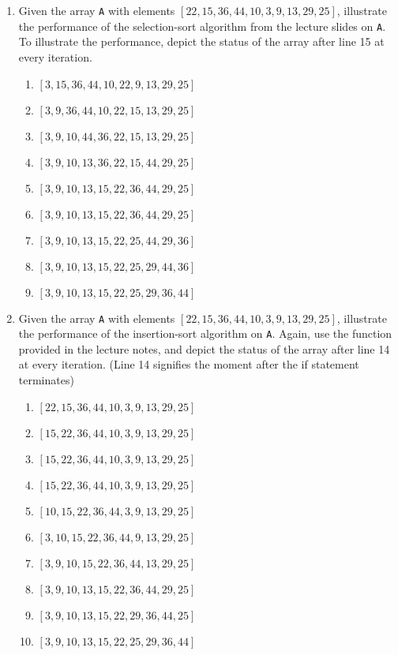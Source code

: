\documentclass[11pt]{article}
\begin{document}
\begin{enumerate}[leftmargin=*]
    \item Given the array \verb|A| with elements $[22, 15, 36, 44, 10, 3, 9, 13, 29, 25]$, illustrate the performance of the selection-sort algorithm from the lecture slides on \verb|A|. To illustrate the performance, depict the status of the array after line 15 at every iteration.
    \begin{enumerate}[label=(i:{\arabic*}),start=0]
            \item $[3, 15, 36, 44, 10, 22, 9, 13, 29, 25]$
            \item $[3, 9, 36, 44, 10, 22, 15, 13, 29, 25]$
            \item $[3, 9, 10, 44, 36, 22, 15, 13, 29, 25]$
            \item $[3, 9, 10, 13, 36, 22, 15, 44, 29, 25]$
            \item $[3, 9, 10, 13, 15, 22, 36, 44, 29, 25]$
            \item $[3, 9, 10, 13, 15, 22, 36, 44, 29, 25]$
            \item $[3, 9, 10, 13, 15, 22, 25, 44, 29, 36]$
            \item $[3, 9, 10, 13, 15, 22, 25, 29, 44, 36]$
            \item $[3, 9, 10, 13, 15, 22, 25, 29, 36, 44]$
    \end{enumerate}
    \item Given the array \verb|A| with elements $[22, 15, 36, 44, 10, 3, 9, 13, 29, 25]$, illustrate the performance of the insertion-sort algorithm on \verb|A|. Again, use the function provided in the lecture notes, and depict the status of the array after line 14 at every iteration. (Line 14 signifies the moment after the if statement terminates)
    \begin{enumerate}[label=(i:{\arabic*}), start=0]
            \item $[22, 15, 36, 44, 10, 3, 9, 13, 29, 25]$
            \item $[15, 22, 36, 44, 10, 3, 9, 13, 29, 25]$
            \item $[15, 22, 36, 44, 10, 3, 9, 13, 29, 25]$
            \item $[15, 22, 36, 44, 10, 3, 9, 13, 29, 25]$
            \item $[10, 15, 22, 36, 44, 3, 9, 13, 29, 25]$
            \item $[3, 10, 15, 22, 36, 44, 9, 13, 29, 25]$
            \item $[3, 9, 10, 15, 22, 36, 44, 13, 29, 25]$
            \item $[3, 9, 10, 13, 15, 22, 36, 44, 29, 25]$
            \item $[3, 9, 10, 13, 15, 22, 29, 36, 44, 25]$
            \item $[3, 9, 10, 13, 15, 22, 25, 29, 36, 44]$
    \end{enumerate}
    

\end{enumerate}
\end{document}
